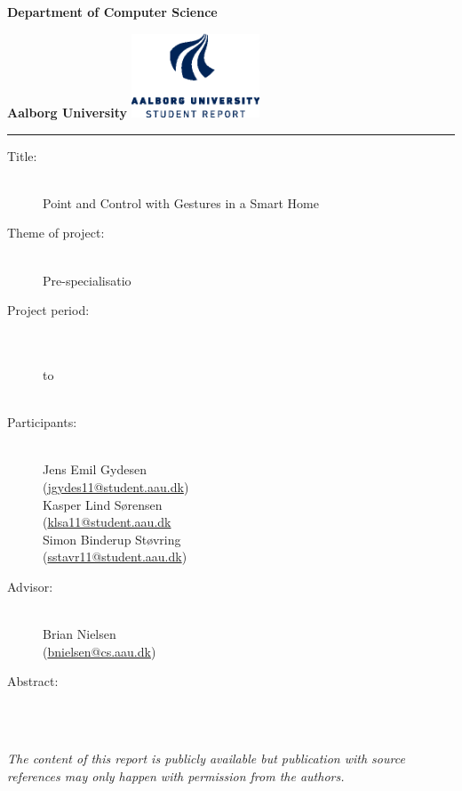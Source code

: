 {\setlength{\parindent}{0pt}
\begin{nopagebreak}
  \begin{minipage}{\textwidth}
    \vspace{2cm}
    \LARGE{\textbf{Department of Computer Science}}\vspace{-2.1cm}

    \large{\textbf{Aalborg University}}
    \hspace{8cm}\includegraphics[height=2.5cm]{images/aau_logo_en_blue.eps}
  \end{minipage}
  \vspace{0.1cm}
  \hrule

  \newcommand{\titleitem}[2]{\item[#1:] ~\\ #2 \\}
  \begin{multicols}{2}
  	\begin{description}
  		\titleitem{Title}{Point and Control with Gestures in a Smart Home}
  		\titleitem{Theme of project}{Pre-specialisatio}
  		\titleitem{Project period}{\protect{}\\ to\\ \protect\formatdate{20}{12}{2015}}
  		\titleitem{Participants}{
  			Jens Emil Gydesen \\ (\url{jgydes11@student.aau.dk})\\ 
  			Kasper Lind Sørensen \\(\url{klsa11@student.aau.dk}\\
  			Simon Binderup Støvring \\(\url{sstavr11@student.aau.dk})
  			}
  		\titleitem{Advisor}{Brian Nielsen\\(\url{bnielsen@cs.aau.dk})}
  	\end{description}
    \vfill
    \columnbreak

    \begin{description}
    	\titleitem{Abstract}{}
    \end{description}

  \end{multicols}
  \vfill

  \begin{center}
    \textit{The content of this report is publicly available but
    publication with source references may only happen with permission from
    the authors.}
  \end{center}
\end{nopagebreak}
}